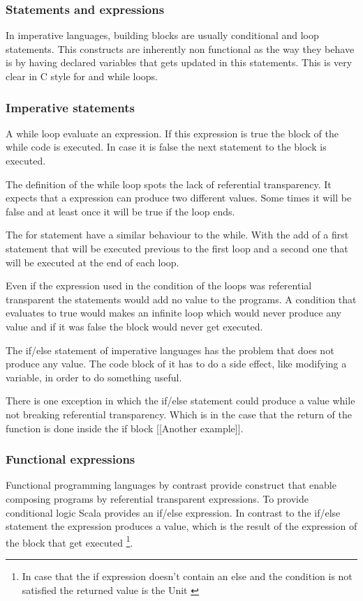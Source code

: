 \documentclass[../main.tex]{subfiles}
\begin{document}
\subsubsection{Statements and expressions} In imperative languages, building
blocks are usually conditional and loop statements. This constructs are
inherently non functional as the way they behave is by having declared variables
that gets updated in this statements. This is very clear in C style for and
while loops.

\subsubsection{Imperative statements} A while loop evaluate an expression. If
this expression is true the block of the while code is executed. In case it is
false the next statement to the block is executed.

The definition of the while loop spots the lack of referential transparency. It
expects that a expression can produce two different values. Some times it will
be false and at least once it will be true if the loop ends.

The for statement have a similar behaviour to the while. With the add of a first
statement that will be executed previous to the first loop and a second one that
will be executed at the end of each loop.

Even if the expression used in the condition of the loops was referential
transparent the statements would add no value to the programs. A condition that
evaluates to true would makes an infinite loop which would never produce any
value and if it was false the block would never get executed.

The if/else statement of imperative languages has the problem that does not
produce any value. The code block of it has to do a side effect, like modifying
a variable, in order to do something useful.

There is one exception in which the if/else statement could produce a value
while not breaking referential transparency. Which is in the case that the
return of the function is done inside the if block [[Another example]].

\subsubsection{Functional expressions} Functional programming languages by
contrast provide construct that enable composing programs by referential
transparent expressions. To provide conditional logic Scala provides an if/else
expression. In contrast to the if/else statement the expression produces a
value, which is the result of the expression of the block that get executed
\footnote{In case that the if expression doesn't contain an else and the
condition is not satisfied the returned value is the Unit
\autocite{ScalaScala.Unit}}.
\end{document}
